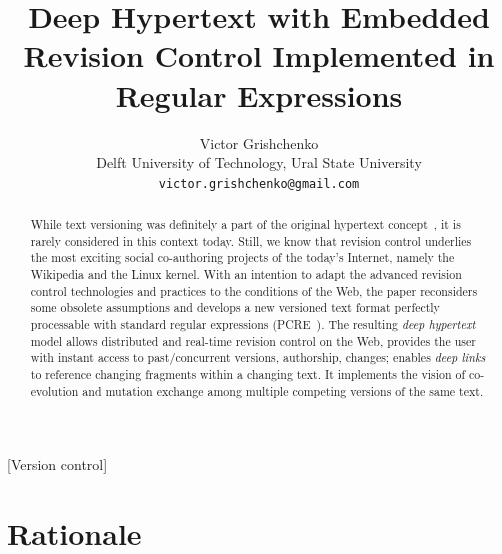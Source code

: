\documentclass{sig-alternate}
\begin{document}

\title{Deep Hypertext with Embedded Revision Control Implemented in Regular Expressions}

\author{Victor Grishchenko \\ \small Delft University of Technology, Ural State University \\ {\tt victor.grishchenko@gmail.com} }

\maketitle

\begin{abstract}
While text versioning was definitely a part of the original hypertext concept~\cite{nls,literary,hyp-ed-sys}, it is rarely considered in this context today.
Still, we know that revision control underlies the most exciting social co-authoring projects of the today's Internet, namely the Wikipedia and the Linux kernel.
With an intention to adapt the advanced revision control technologies and practices to the conditions of the Web, the paper reconsiders some obsolete assumptions and develops a new versioned text format perfectly processable with standard regular expressions (PCRE~\cite{pcre}).
The resulting \emph{deep hypertext} model allows distributed and real-time revision control on the Web, provides the user with instant access to past/concurrent versions, authorship, changes; enables \emph{deep links} to reference changing fragments within a changing text.
It implements the vision of co-evolution and mutation exchange among multiple competing versions of the same text. 

\end{abstract}

[Version control]

\section{Rationale}
\end{document}
